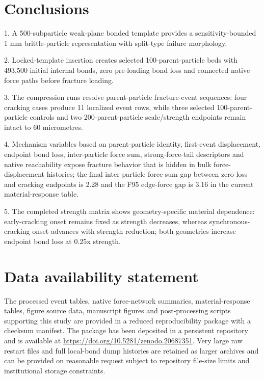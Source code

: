 \documentclass[preprint,12pt]{elsarticle}
\begin{document}
\section{Conclusions}

1. A 500-subparticle weak-plane bonded template provides a sensitivity-bounded 1 mm brittle-particle representation with split-type failure morphology.

2. Locked-template insertion creates selected 100-parent-particle beds with 493,500 initial internal bonds, zero pre-loading bond loss and connected native force paths before fracture loading.

3. The compression runs resolve parent-particle fracture-event sequences: four cracking cases produce 11 localized event rows, while three selected 100-parent-particle controls and two 200-parent-particle scale/strength endpoints remain intact to 60 micrometres.

4. Mechanism variables based on parent-particle identity, first-event displacement, endpoint bond loss, inter-particle force sum, strong-force-tail descriptors and native reachability expose fracture behavior that is hidden in bulk force-displacement histories; the final inter-particle force-sum gap between zero-loss and cracking endpoints is 2.28 and the F95 edge-force gap is 3.16 in the current material-response table.

5. The completed strength matrix shows geometry-specific material dependence: early-cracking onset remains fixed as strength decreases, whereas synchronous-cracking onset advances with strength reduction; both geometries increase endpoint bond loss at 0.25x strength.


\section{Data availability statement}

The processed event tables, native force-network summaries, material-response tables, figure source data, manuscript figures and post-processing scripts supporting this study are provided in a reduced reproducibility package with a checksum manifest. The package has been deposited in a persistent repository and is available at \url{https://doi.org/10.5281/zenodo.20687351}. Very large raw restart files and full local-bond dump histories are retained as larger archives and can be provided on reasonable request subject to repository file-size limits and institutional storage constraints.
\end{document}
